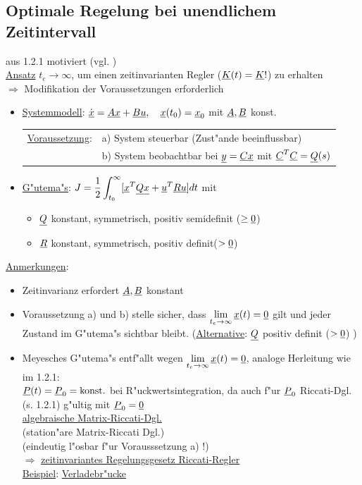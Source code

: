 \documentclass[openany,a4paper,11pt]{book}
\begin{document}
\subsection{Optimale Regelung bei unendlichem Zeitintervall}
aus 1.2.1 motiviert (vgl. )\\
\uline{Ansatz} $t_e \rightarrow \infty$, um einen zeitinvarianten Regler ($\uline{K}(t)=\uline{K}!$) zu erhalten\\
$\Rightarrow$ Modifikation der Voraussetzungen erforderlich
\begin{itemize}
    \item \uline{Systemmodell}: \quad $\dot{\uline{x}}=\uline{Ax}+\uline{Bu}, \quad \uline{x}(t_0)=\uline{x}_0$ mit $\uline{A}, \uline{B}$ konst.\\
    \begin{tabular}{ll}
        \uline{Voraussetzung}: & a) System steuerbar  (Zust"ande beeinflussbar)\\
            & b) System beobachtbar bei $\uline{y}=\uline{Cx}$ \quad mit $\uline{C}^T\uline{C}=\uline{Q}(s)$
    \end{tabular}
    \item \uline{G"utema"s}: \quad  $\displaystyle J=\frac{1}{2}\int_{t_0}^{\infty}[\uline{x}^T\uline{Qx}+\uline{u}^T\uline{Ru}]dt$ \quad mit \begin{itemize}
        \item $\uline{Q}$ konstant, symmetrisch, positiv semidefinit ($\ge \uline{0}$)
        \item $\uline{R}$ konstant, symmetrisch, positiv definit($>\uline{0}$)
    \end{itemize}
\end{itemize}
\uline{Anmerkungen}: \begin{itemize}
    \item Zeitinvarianz erfordert $\uline{A}, \uline{B}$ konstant
    \item Voraussetzung a) und b) stelle sicher, dass $\mathop{\text{lim}}\limits_{t_e\rightarrow \infty} \uline{x}(t)=\uline{0}$ gilt und jeder Zustand im G"utema"s sichtbar bleibt. (\uline{Alternative}: $\uline{Q}$ positiv definit ($>\uline{0}$) )
    \item Meyesches G"utema"s entf"allt wegen $\mathop{\text{lim}}\limits_{t_e\rightarrow \infty}\uline{x}(t)=\uline{0}$, analoge Herleitung wie im 1.2.1:\\
    $\uline{P}(t)=\uline{P}_0=\text{konst.}$ bei R"uckwertsintegration, da auch f"ur $\uline{P}_0$ Riccati-Dgl. (s. 1.2.1) g"ultig mit $\uline{P}_0=\uline{0}$\\
     \quad \uline{algebraische Matrix-Riccati-Dgl.} \\(station"are Matrix-Riccati Dgl.)\\ (eindeutig l"osbar f"ur Vorausssetzung a) !)\\
    $\Rightarrow$  \quad \uline{zeitinvariantes Regelungsgesetz Riccati-Regler}\\
    \uline{Beispiel}: \uline{Verladebr"ucke}     
\end{itemize}
\end{document}
